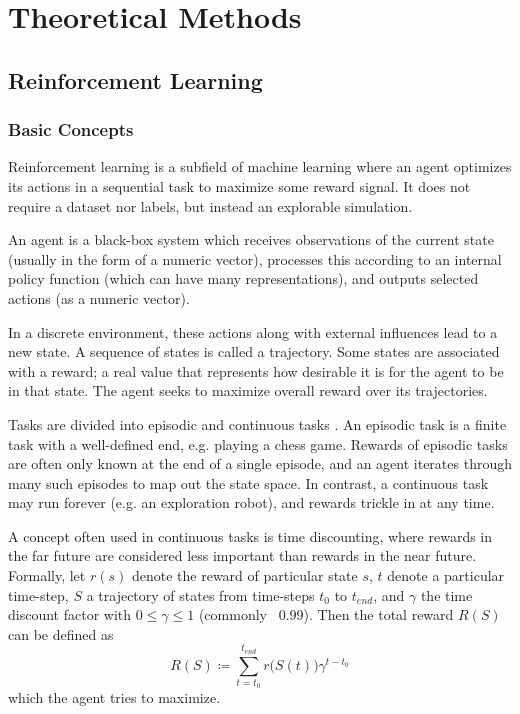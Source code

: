 \chapter{Theoretical Methods}


\section{Reinforcement Learning}
\label{ReinforcementLearningChapter}
\subsection{Basic Concepts}
Reinforcement learning is a subfield of machine learning where an agent optimizes its actions in a sequential task to maximize some reward signal. It does not require a dataset nor labels, but instead an explorable simulation.

An agent is a black-box system which receives observations of the current state (usually in the form of a numeric vector), processes this according to an internal policy function (which can have many representations), and outputs selected actions (as a numeric vector).

In a discrete environment, these actions along with external influences lead to a new state. A sequence of states is called a trajectory. Some states are associated with a reward; a real value that represents how desirable it is for the agent to be in that state. The agent seeks to maximize overall reward over its trajectories.

Tasks are divided into episodic and continuous tasks \cite[chapters 3.3 \& 3.4]{Sutton}. An episodic task is a finite task with a well-defined end, e.g. playing a chess game. Rewards of episodic tasks are often only known at the end of a single episode, and an agent iterates through many such episodes to map out the state space. In contrast, a continuous task may run forever (e.g. an exploration robot), and rewards trickle in at any time.

A concept often used in continuous tasks is time discounting, where rewards in the far future are considered less important than rewards in the near future. Formally, let $r(s)$ denote the reward of particular state $s$, $t$ denote a particular time-step, $S$ a trajectory of states from time-steps $t_0$ to $t_{end}$, and $\gamma$ the time discount factor with $0 \leq \gamma \leq 1$ (commonly ~0.99). Then the total reward $R(S)$ can be defined as
\begin{equation}
    R(S) \coloneqq \sum_{t=t_0}^{t_{end}}{r\big(S(t)\big)\gamma^{t-t_0}}
\end{equation}
which the agent tries to maximize.


